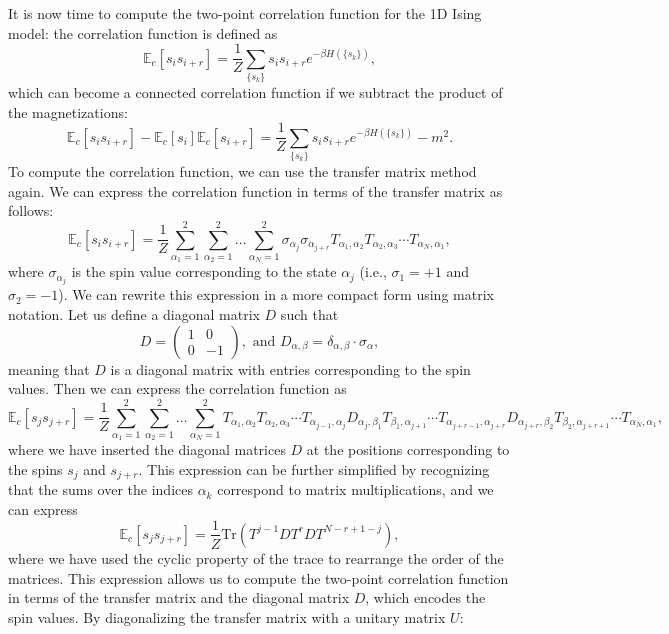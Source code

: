 It is now time to compute the two-point correlation function for the 1D Ising model: the correlation function is defined as
\[
    \mathbb{E}_{c}\left[ s_i s_{i+r} \right] = \frac{1}{Z} \sum_{\{s_k\}} s_i s_{i+r} e^{-\beta H(\{s_k\})},
\]
which can become a connected correlation function if we subtract the product of the magnetizations:
\[
    \mathbb{E}_{c}\left[ s_i s_{i+r} \right] - \mathbb{E}_{c}\left[ s_i \right] \mathbb{E}_{c}\left[ s_{i+r} \right] = \frac{1}{Z} \sum_{\{s_k\}} s_i s_{i+r} e^{-\beta H(\{s_k\})} - m^2.
\]
To compute the correlation function, we can use the transfer matrix method again. We can express the correlation function in terms of the transfer matrix as follows:
\[
    \mathbb{E}_{c}\left[ s_i s_{i+r} \right] = \frac{1}{Z} \sum_{\alpha_1=1}^2 \sum_{\alpha_2=1}^2 \dots \sum_{\alpha_N=1}^2 \sigma_{\alpha_j} \sigma_{\alpha_{j+r}} T_{\alpha_1, \alpha_2} T_{\alpha_2, \alpha_3} \cdots T_{\alpha_N, \alpha_1},
\]
where \(\sigma_{\alpha_j}\) is the spin value corresponding to the state \(\alpha_j\) (i.e., \(\sigma_1 = +1\) and \(\sigma_2 = -1\)). We can rewrite this expression in a more compact form using matrix notation. Let us define a diagonal matrix \(D\) such that
\[
    D = \begin{pmatrix}
        1 & 0  \\
        0 & -1
    \end{pmatrix}, \text{ and } D_{\alpha,\beta} = \delta_{\alpha,\beta} \cdot \sigma_{\alpha},
\]
meaning that \(D\) is a diagonal matrix with entries corresponding to the spin values. Then we can express the correlation function as
\[
    \mathbb{E}_{c}\left[ s_j s_{j+r} \right] = \frac{1}{Z} \sum_{\alpha_1=1}^2 \sum_{\alpha_2=1}^2 \dots \sum_{\alpha_N=1}^2 T_{\alpha_1, \alpha_2} T_{\alpha_2, \alpha_3} \cdots T_{\alpha_{j-1}, \alpha_j} D_{\alpha_j, \beta_1} T_{\beta_1, \alpha_{j+1}} \cdots T_{\alpha_{j+r-1}, \alpha_{j+r}} D_{\alpha_{j+r}, \beta_2} T_{\beta_2, \alpha_{j+r+1}} \cdots T_{\alpha_N, \alpha_1},
\]
where we have inserted the diagonal matrices \(D\) at the positions corresponding to the spins \(s_j\) and \(s_{j+r}\). This expression can be further simplified by recognizing that the sums over the indices \(\alpha_k\) correspond to matrix multiplications, and we can express
\[
    \mathbb{E}_{c}\left[ s_j s_{j+r} \right] = \frac{1}{Z} \text{Tr}(T^{j-1} D T^{r} D T^{N-r+1-j}),
\]
where we have used the cyclic property of the trace to rearrange the order of the matrices. This expression allows us to compute the two-point correlation function in terms of the transfer matrix and the diagonal matrix \(D\), which encodes the spin values. By diagonalizing the transfer matrix with a unitary matrix \(U\):
